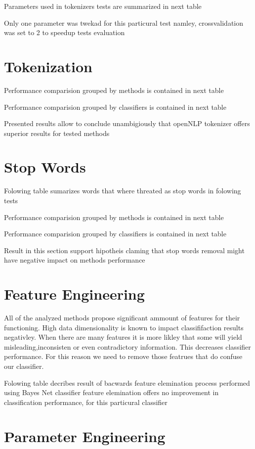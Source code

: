 Parameters used in tokenizers tests are summarized in next table

%

Only one parameter was twekad for this particural test namley, crossvalidation was set to 2
to speedup tests evaluation
\pagebreak
\section{Tokenization}

Performance comparision grouped by methods is contained in next table

%
\pagebreak
Performance comparision grouped by classifiers is contained in next table



Presented results allow to conclude unambigiously that openNLP tokenizer offers superior results for tested methods 
\pagebreak
\section{Stop Words}

Folowing table sumarizes words that where threated as stop words in folowing tests

%

Performance comparision grouped by methods is contained in next table

%

Performance comparision grouped by classifiers is contained in next table

%

Result in this section support hipotheis claming that stop words removal might have negative impact on methods performance
\pagebreak
\section{Feature Engineering}

All of the analyzed methods propose significant ammount of features for their functioning. High data dimensionality is known to 
impact classififaction results negativley. When there are many features it is more likley that some will yield misleading,inconsisten or even contradictory
information. This decreases classifier performance. For this reason we need to remove those featrues that do confuse our classifier. 

 

Folowing table decribes result of bacwards feature elemination process performed using Bayes Net classifier
%
feature elemination offers no improvement in classification performance, for this particural classifier
%
%
%
%
%
%
\section{Parameter Engineering}